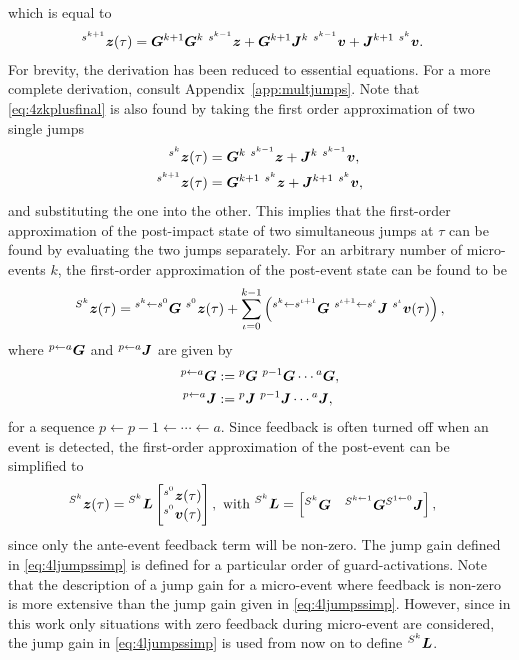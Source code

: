 \documentclass[../DC2017114Bouma.tex]{subfiles}
\begin{document}
which is equal to
\begin{align}
&\ls^{s^{k+1}}\zb(\tau) = \Gb^{k+1}\Gb^k\ ^{s^{k-1}}\zb + \Gb^{k+1}\Jb^{k}\ ^{s^{k-1}}\vb + \Jb^{k+1}\ ^{s^{k}}\vb.\label{eq:4zkplusfinal}
\end{align}
For brevity, the derivation has been reduced to essential equations. For a more complete derivation, consult Appendix~\ref{app:multjumps}. Note that \eqref{eq:4zkplusfinal} is also found by taking the first order approximation of two single jumps
\begin{align}
\ls^{s^{k}}\zb(\tau) &= \Gb^k\ ^{s^{k-1}}\zb + \Jb^{k}\ ^{s^{k-1}}\vb,\\
\ls^{s^{k+1}}\zb(\tau) &= \Gb^{k+1}\ ^{s^{k}}\zb + \Jb^{k+1}\ ^{s^{k}}\vb,
\end{align}
and substituting the one into the other. This implies that the first-order approximation of the post-impact state of two simultaneous jumps at $\tau$ can be found by evaluating the two jumps separately. For an arbitrary number of micro-events $k$, the first-order approximation of the post-event state can be found to be
\begin{align}
\ls^{S^k}\zb(\tau) = \ls^{s^k\leftarrow s^0}\Gb\ ^{s^0}\zb(\tau) + \sum_{\iota=0}^{k-1}\left(\ls^{s^{k}\leftarrow s^{\iota+1}}\Gb\ ^{s^{\iota+1}\leftarrow s^{\iota}}\Jb\ ^{s^{\iota}}\vb(\tau)\right),\label{eq:4ljumps}
\end{align}
where $\hspace{0cm}^{p\leftarrow a}{\boldsymbol{G}}$ and $\hspace{0cm}^{p\leftarrow a}{\boldsymbol{J}}$ are given by
\begin{align}
\hspace{0cm}^{p\leftarrow a}{\boldsymbol{G}} &:= \hspace{0cm}^{p}{\boldsymbol{G}}\ ^{p-1}{\boldsymbol{G}}\cdots\hspace{0cm}^{a}{\boldsymbol{G}},\\
\hspace{0cm}^{p\leftarrow a}{\boldsymbol{J}} &:= \hspace{0cm}^{p}{\boldsymbol{J}}\ ^{p-1}{\boldsymbol{J}}\cdots\hspace{0cm}^{a}{\boldsymbol{J}},
\end{align}
for a sequence $p\leftarrow p-1 \leftarrow \cdots \leftarrow a$. Since feedback is often turned off when an event is detected, the first-order approximation of the post-event can be simplified to
\begin{align}
\hspace{0cm}^{S^k}{\boldsymbol{z}}(\tau) &= \hspace{0cm}^{S^k}{\boldsymbol{L}} \begin{bmatrix}
\hspace{0cm}^{s^0}{\boldsymbol{z}}(\tau) \\ \hspace{0cm}^{s^0}{\boldsymbol{v}}(\tau)
\end{bmatrix}, \text{ with }\hspace{0cm}^{S^k}{\boldsymbol{L}} = \begin{bmatrix}
\hspace{0cm}^{S^k}{\boldsymbol{G}} & \hspace{0cm}^{S^{k\leftarrow 1}}{\boldsymbol{G}}\hspace{0cm}^{S^{1\leftarrow 0}}{\boldsymbol{J}}
\end{bmatrix},\label{eq:4ljumpssimp}
\end{align}
since only the ante-event feedback term will be non-zero. The jump gain defined in \eqref{eq:4ljumpssimp} is defined for a particular order of guard-activations. Note that the description of a jump gain for a micro-event where feedback is non-zero is more extensive than the jump gain given in \eqref{eq:4ljumpssimp}. However, since in this work only situations with zero feedback during micro-event are considered, the jump gain in \eqref{eq:4ljumpssimp} is used from now on to define $\hspace{0cm}^{S^k}{\boldsymbol{L}}$.
\end{document}
